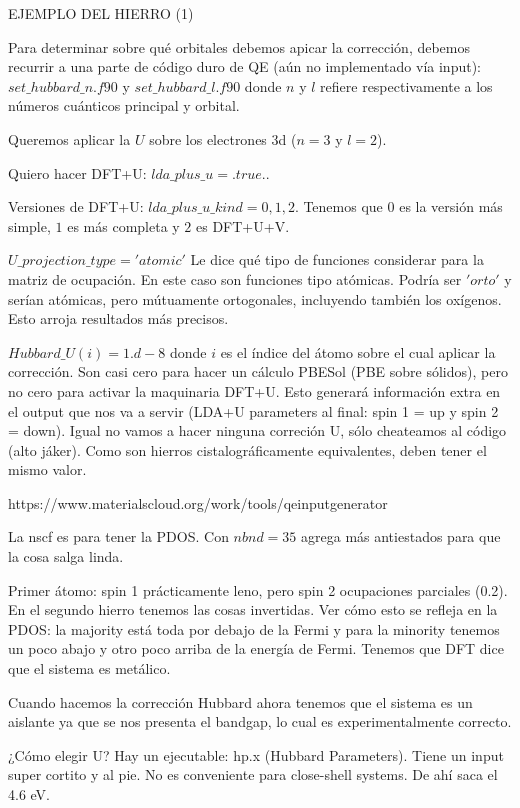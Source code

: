 EJEMPLO DEL HIERRO (1)

  Para determinar sobre qué orbitales debemos apicar la corrección, debemos recurrir a una parte de código duro de QE (aún no implementado vía input): $set\_hubbard\_n.f90$ y $set\_hubbard\_l.f90$ donde $n$ y $l$ refiere respectivamente a los números cuánticos principal y orbital.

  Queremos aplicar la $U$ sobre los electrones 3d ($n=3$ y $l=2$).

  Quiero hacer DFT+U: $lda\_plus\_u = .true.$.

  Versiones de DFT+U: $lda\_plus\_u\_kind = 0,1,2$. Tenemos que $0$ es la versión más simple, $1$ es más completa y $2$ es DFT+U+V.

  $U\_projection\_type = 'atomic'$ Le dice qué tipo de funciones considerar para la matriz de ocupación. En este caso son funciones tipo atómicas. Podría ser $'orto'$ y serían atómicas, pero mútuamente ortogonales, incluyendo también los oxígenos. Esto arroja resultados más precisos.

  $Hubbard\_U(i) = 1.d-8$ donde $i$ es el índice del átomo sobre el cual aplicar la corrección. Son casi cero para hacer un cálculo PBESol (PBE sobre sólidos), pero no cero para activar la maquinaria DFT+U. Esto generará información extra en el output que nos va a servir (LDA+U parameters al final: spin 1 = up y spin 2 = down). Igual no vamos a hacer ninguna correción U, sólo cheateamos al código (alto jáker). Como son hierros cistalográficamente equivalentes, deben tener el mismo valor.

  https://www.materialscloud.org/work/tools/qeinputgenerator

  La nscf es para tener la PDOS. Con $nbnd = 35$ agrega más antiestados para que la cosa salga linda.

  Primer átomo: spin 1 prácticamente leno, pero spin 2 ocupaciones parciales (0.2). En el segundo hierro tenemos las cosas invertidas. Ver cómo esto se refleja en la PDOS: la majority está toda por debajo de la Fermi y para la minority tenemos un poco abajo y otro poco arriba de la energía de Fermi. Tenemos que DFT dice que el sistema es metálico.

  Cuando hacemos la corrección Hubbard ahora tenemos que el sistema es un aislante ya que se nos presenta el bandgap, lo cual es experimentalmente correcto.

  ¿Cómo elegir U?  Hay un ejecutable: hp.x (Hubbard Parameters). Tiene un input super cortito y al pie. No es conveniente para close-shell systems. De ahí saca el 4.6 eV.

